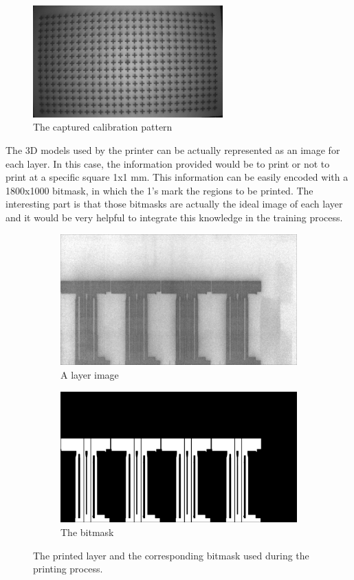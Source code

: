 \begin{figure}[!h]
  \includegraphics[width=0.65\textwidth]{images/introduction/calibration_pattern}
  \centering
  \caption{The captured calibration pattern}
  \label{intro:calibration}
\end{figure}

The 3D models used by the printer can be actually represented as an image for each layer. In this case, the information provided would be to print or not to print at a specific square 1x1 mm. This information can be easily encoded with a 1800x1000 bitmask, in which the 1's mark the regions to be printed. The interesting part is that those bitmasks are actually the ideal image of each layer and it would be very helpful to integrate this knowledge in the training process. \\

\begin{figure}[!h]
\centering
\begin{subfigure}{.5\textwidth}
  \centering
  \includegraphics[width=.5\linewidth]{images/introduction/layer_00100}
  \caption{A layer image}
\end{subfigure}%
\begin{subfigure}{.5\textwidth}
  \centering
  \includegraphics[width=.5\linewidth]{images/introduction/bitmask_00100}
  \caption{The bitmask}
\end{subfigure}
\caption{The printed layer and the corresponding bitmask used during the printing process.}
\label{TODO}
\end{figure}

